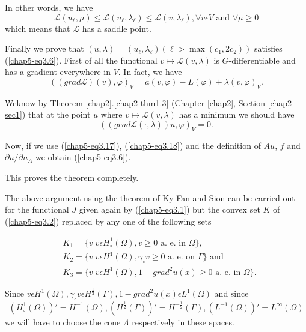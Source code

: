 In other words, we have
$$
\mathscr{L} (u_{\ell}, \mu) \leq \mathscr{L} (u_{\ell}, \lambda_{\ell}) \leq \mathscr{L} (v, \lambda_{\ell}), \forall v \epsilon V \text{ and } \forall \mu \geq 0
$$
which means that $\mathscr{L}$ has a saddle point.

Finally we prove that $(u, \lambda) = (u_{\ell}, \lambda_{\ell}) (\ell > \max (c_{1}, 2c_{2}))$ satisfies (\ref{chap5-eq3.6}). First of all the functional $v \mapsto \mathscr{L} (v, \lambda)$ is $G$-differentiable and has a gradient everywhere in $V$. In fact, we have
\begin{equation*}
((grad \mathscr{L}) (v), \varphi)_{V} = a(v, \varphi) - L(\varphi) + \lambda(v, \varphi)_{V}.\tag{3.17}\label{chap5-eq3.17}
\end{equation*}

We\pageoriginale know by Theorem \ref{chap2}.\ref{chap2-thm1.3} (Chapter \ref{chap2}, Section \ref{chap2-sec1}) that at the point $u$ where $v \mapsto \mathscr{L} (v, \lambda)$ has a minimum we should have
\begin{equation*}
((grad \mathscr{L} (\cdot ,  \lambda))u, \varphi)_{V} = 0.\tag{3.18}\label{chap5-eq3.18}
\end{equation*}

Now, if we use (\ref{chap5-eq3.17}), (\ref{chap5-eq3.18}) and the definition of $Au$, $f$ and $\partial u / \partial n_{A}$ we obtain (\ref{chap5-eq3.6}).

This proves the theorem completely.

\begin{remark}\label{chap5-rem3.1}
  The above argument using the theorem of Ky Fan and Sion can be carried out for the functional $J$ given again by (\ref{chap5-eq3.1}) but the convex set $K$ of (\ref{chap5-eq3.2}) replaced by any one of the following sets
\end{remark}
\begin{align*}
& K_{1} = \{ v | v \epsilon H_{\circ}^{1} (\Omega), v \geq 0 \text{ a. e. in } \Omega \},\\
& K_{2} = \{ v | v \epsilon H^{1} (\Omega), \gamma_{\circ} v \geq 0 \text{ a. e. on } \Gamma \} \text{ and }\\
& K_{3} = \{ v | v \epsilon H^{1} (\Omega), 1-grad^{2} u(x) \geq 0 \text{ a. e. in } \Omega \}.
\end{align*}

Since $v \epsilon H^{1}(\Omega), \gamma_{\circ} v \epsilon H^{\frac{1}{2}} (\Gamma), 1-grad^{2} u(x) \epsilon L^{1} (\Omega)$ and since
$$
(H_{\circ}^{1} (\Omega))' = H^{-1} (\Omega), (H^{\frac{1}{2}} (\Gamma))' = H^{-\frac{1}{2}}(\Gamma), (L^{-1} (\Omega))' = L^{\infty} (\Omega)
$$
we will have to choose the cone $\Lambda$ respectively in these spaces.

